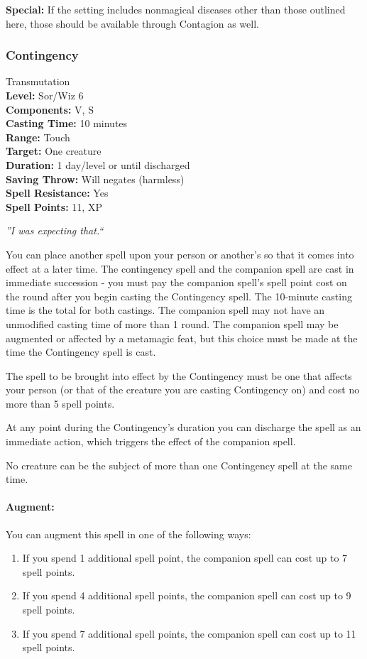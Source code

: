 \textbf{Special:} If the setting includes nonmagical diseases other than those outlined here,
those should be available through Contagion as well.
\subsubsection{Contingency}
\label{Spell:Contingency}
Transmutation
\\ \textbf{Level:} Sor/Wiz 6
\\ \textbf{Components:} V, S
\\ \textbf{Casting Time:} 10 minutes
\\ \textbf{Range:} Touch
\\ \textbf{Target:} One creature
\\ \textbf{Duration:} 1 day/level or until discharged
\\ \textbf{Saving Throw:} Will negates (harmless)
\\ \textbf{Spell Resistance:} Yes
\\ \textbf{Spell Points:} 11, XP

\emph{''I was expecting that.``}

You can place another spell upon your person or another's so that it comes into effect at a later time.
The contingency spell and the companion spell are cast in immediate succession - you must pay the companion spell's spell point cost on the round after you begin casting the Contingency spell. 
The 10-minute casting time is the total for both castings.
The companion spell may not have an unmodified casting time of more than 1 round.
The companion spell may be augmented or affected by a metamagic feat, but this choice must be made at the time the Contingency spell is cast.

The spell to be brought into effect by the Contingency must be one that affects your person (or that of the creature you are casting Contingency on)
and cost no more than 5 spell points.

At any point during the Contingency's duration you can discharge the spell as an immediate action, which triggers the effect of the companion spell.

No creature can be the subject of more than one Contingency spell at the same time. 

\paragraph{Augment:} You can augment this spell in one of the following ways:
\begin{enumerate}
 \item If you spend 1 additional spell point, the companion spell can cost up to 7 spell points.
 \item If you spend 4 additional spell points, the companion spell can cost up to 9 spell points.
 \item If you spend 7 additional spell points, the companion spell can cost up to 11 spell points.
\end{enumerate}

